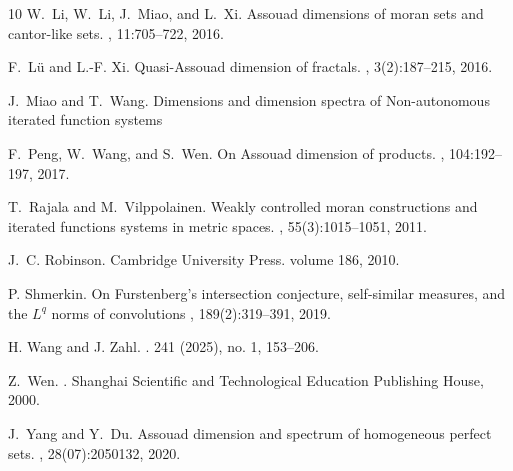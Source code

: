 \documentclass[12pt]{amsart}
\numberwithin{equation}{section}
\theoremstyle{plain}
\theoremstyle{remark}
\theoremstyle{definition}
\begin{document}
\begin{thebibliography}{10}
		W.~Li, W.~Li, J.~Miao, and L.~Xi.
		\newblock Assouad dimensions of moran sets and cantor-like sets.
		, 11:705--722, 2016.
		

		
		F.~L{\"u} and L.-F. Xi.
		\newblock Quasi-{A}ssouad dimension of fractals.
		, 3(2):187--215, 2016.
		
		
	
		
		J.~Miao and T.~Wang.
		\newblock Dimensions and dimension spectra of Non-autonomous iterated function systems
	
		F.~Peng, W.~Wang, and S.~Wen.
		\newblock On {A}ssouad dimension of products.
		, 104:192--197, 2017.
		
		T.~Rajala and M.~Vilppolainen.
		\newblock Weakly controlled moran constructions and iterated functions systems
		in metric spaces.
		, 55(3):1015--1051, 2011.
		
		J.~C. Robinson.
		\newblock Cambridge University Press. volume 186, 2010.

		P. Shmerkin.
		\newblock On {F}urstenberg's intersection conjecture, self-similar  measures, and the {$L^q$} norms of convolutions
		, 189(2):319–391, 2019.
		
         H. Wang and J.  Zahl.
        .
          241 (2025), no. 1, 153–206.


		Z.~Wen.
		.
		\newblock Shanghai Scientific and Technological Education Publishing House,
		2000.
		
		J.~Yang and Y.~Du.
		\newblock Assouad dimension and spectrum of homogeneous perfect sets.
		, 28(07):2050132, 2020.
		
	\end{thebibliography}
	
	
\end{document}
